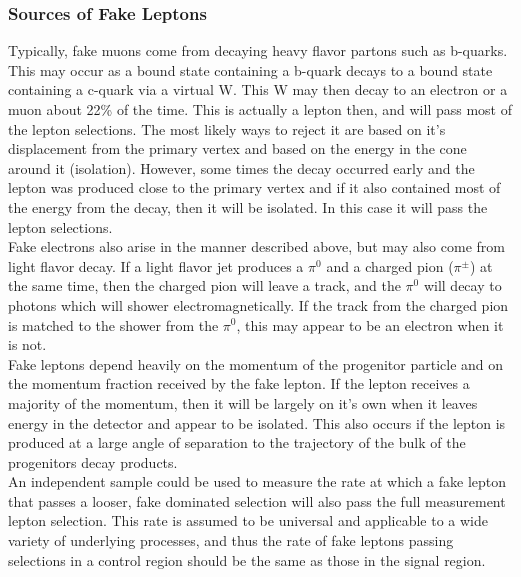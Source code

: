         		\subsubsection{Sources of Fake Leptons}
		Typically, fake muons come from decaying heavy flavor partons such as b-quarks. This may occur as a bound state containing a b-quark decays to a bound state containing a c-quark via a virtual W. This W may then decay to an electron or a muon about 22\% of the time. This is actually a lepton then, and will pass most of the lepton selections. The most likely ways to reject it are based on it's displacement from the primary vertex and based on the energy in the cone around it (isolation). However, some times the decay occurred early and the lepton was produced close to the primary vertex and if it also contained most of the energy from the decay, then it will be isolated. In this case it will pass the lepton selections.\\
		
		Fake electrons also arise in the manner described above, but may also come from light flavor decay. If a light flavor jet produces a $\pi^0$ and a charged pion ($\pi^{\pm}$) at the same time, then the charged pion will leave a track, and the $\pi^0$ will decay to photons which will shower electromagnetically. If the track from the charged pion is matched to the shower from the $\pi^0$, this may appear to be an electron when it is not.\\
		
		Fake leptons depend heavily on the momentum of the progenitor particle and on the momentum fraction received by the fake lepton. If the lepton receives a majority of the momentum, then it will be largely on it's own when it leaves energy in the detector and appear to be isolated. This also occurs if the lepton is produced at a large angle of separation to the trajectory of the bulk of the progenitors decay products.\\
		
		An independent sample could be used to measure the rate at which a fake lepton that passes a looser, fake dominated selection will also pass the full measurement lepton selection. This rate is assumed to be universal and applicable to a wide variety of underlying processes, and thus the rate of fake leptons passing selections in a control region should be the same as those in the signal region.\\
		
